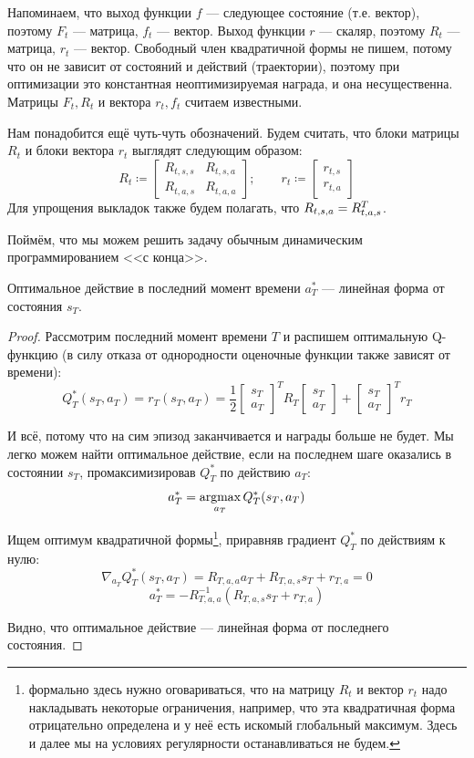Напоминаем, что выход функции $f$ --- следующее состояние (т.е. вектор), поэтому $F_t$ --- матрица, $f_t$ --- вектор. Выход функции $r$ --- скаляр, поэтому $R_t$ --- матрица, $r_t$ --- вектор. Свободный член квадратичной формы не пишем, потому что он не зависит от состояний и действий (траектории), поэтому при оптимизации это константная неоптимизируемая награда, и она несущественна. Матрицы $F_t, R_t$ и вектора $r_t, f_t$ считаем известными. 

Нам понадобится ещё чуть-чуть обозначений. Будем считать, что блоки матрицы $R_t$ и блоки вектора $r_t$ выглядят следующим образом:
$$R_t \coloneqq \begin{bmatrix} R_{t, s, s} & R_{t, s, a} \\ R_{t, a, s} & R_{t, a, a} \end{bmatrix}; \qquad r_t \coloneqq \begin{bmatrix} r_{t, s} \\ r_{t, a} \end{bmatrix}$$
Для упрощения выкладок также будем полагать, что $R_{t, s, a} \HM= R^T_{t, a, s}$.

Поймём, что мы можем решить задачу обычным динамическим программированием <<с конца>>.
\begin{theorem}
Оптимальное действие в последний момент времени $a_T^*$ --- линейная форма от состояния $s_T$.
\begin{proof}
Рассмотрим последний момент времени $T$ и распишем оптимальную Q-функцию (в силу отказа от однородности оценочные функции также зависят от времени):
$$Q^*_T(s_T, a_T) = r_T(s_T, a_T) = \frac{1}{2} \begin{bmatrix} s_T \\ a_T \end{bmatrix}^T R_T \begin{bmatrix} s_T \\ a_T \end{bmatrix} + \begin{bmatrix} s_T \\ a_T \end{bmatrix}^T r_T$$

И всё, потому что на сим эпизод заканчивается и награды больше не будет. Мы легко можем найти оптимальное действие, если на последнем шаге оказались в состоянии $s_T$, промаксимизировав $Q^*_T$ по действию $a_T$:
$$a^*_T = \mathop{\mathrm{argmax}}_{a_T} Q^*_T(s_T, a_T)$$

Ищем оптимум квадратичной формы\footnote{формально здесь нужно оговариваться, что на матрицу $R_t$ и вектор $r_t$ надо накладывать некоторые ограничения, например, что эта квадратичная форма отрицательно определена и у неё есть искомый глобальный максимум. Здесь и далее мы на условиях регулярности останавливаться не будем.}, приравняв градиент $Q^*_T$ по действиям к нулю:
$$\nabla_{a_T} Q^*_T(s_T, a_T) = R_{T, a, a} a_T + R_{T, a, s}s_T + r_{T, a} = 0$$
$$a^*_T = -R_{T, a, a}^{-1} \left( R_{T, a, s}s_T + r_{T, a} \right)$$

Видно, что оптимальное действие --- линейная форма от последнего состояния. 
\end{proof}
\end{theorem}

